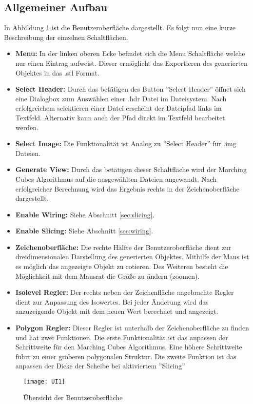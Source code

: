 \subsection{Allgemeiner Aufbau}
In Abbildung \ref{fig:UI1} ist die Benutzeroberfläche dargestellt. Es folgt nun eine kurze Beschreibung der einzelnen Schaltflächen.
\begin{itemize}
	\item \textbf{Menu:} In der linken oberen Ecke befindet sich die Menu Schaltfläche welche nur einen Eintrag aufweist. Dieser ermöglicht das Exportieren des generierten Objektes in das .stl Format.
	\item \textbf{Select Header:} Durch das betätigen des Button ''Select Header'' öffnet sich eine Dialogbox zum Auswählen einer .hdr Datei im Dateisystem. Nach erfolgreichem selektieren einer Datei erscheint der Dateipfad links im Textfeld. Alternativ kann auch der Pfad direkt im Textfeld bearbeitet werden.
	\item \textbf{Select Image:} Die Funktionalität ist Analog zu ''Select Header'' für .img Dateien.
	\item \textbf{Generate View:} Durch das betätigen dieser Schaltfläche wird der Marching Cubes Algorithmus auf die ausgewählten Dateien angewandt. Nach erfolgreicher Berechnung wird das Ergebnis rechts in der Zeichenoberfläche dargestellt.
	\item \textbf{Enable Wiring:} Siehe Abschnitt \ref{sec:slicing}.
	\item \textbf{Enable Slicing:} Siehe Abschnitt \ref{sec:wiring}.
	\item \textbf{Zeichenoberfläche:} Die rechte Hälfte der Benutzeroberfläche dient zur dreidimensionalen Darstellung des generierten Objektes. Mithilfe der Maus ist es möglich das angezeigte Objekt zu rotieren. Des Weiteren besteht die Möglichkeit mit dem Mausrat die Größe zu ändern (zoomen).
	\item \textbf{Isolevel Regler:} Der rechts neben der Zeichenfläche angebrachte Regler dient zur Anpassung des Isowertes. Bei jeder Änderung wird das anzuzeigende Objekt mit dem neuen Wert berechnet und angezeigt.
	\item \textbf{Polygon Regler:} Dieser Regler ist unterhalb der Zeichenoberfläche zu finden und hat zwei Funktionen. Die erste Funktionalität ist das anpassen der Schrittweite für den Marching Cubes Algorithmus. Eine höhere Schrittweite führt zu einer gröberen polygonalen Struktur. Die zweite Funktion ist das anpassen der Dicke der Scheibe bei aktiviertem ''Slicing''
\end{itemize}
\begin{figure}[H]
	\centering
	\texttt{[image: UI1]}
	\caption{Übersicht der Benutzeroberfläche}
	\label{fig:UI1}
\end{figure}
